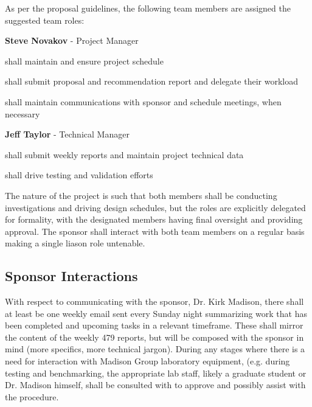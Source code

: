 As per the proposal guidelines, the following team members are assigned the
suggested team roles:
\begin{packed_itemize}
  \item{\textbf{Steve Novakov} - Project Manager}
    \begin{packed_itemize}
      \item shall maintain and ensure project schedule
      \item shall submit proposal and recommendation report and delegate their
      workload
      \item shall maintain communications with sponsor and schedule meetings,
      when necessary
    \end{packed_itemize}
  \item{\textbf{Jeff Taylor} - Technical Manager}
    \begin{packed_itemize}
      \item shall submit weekly reports and maintain project technical data
      \item shall drive testing and validation efforts
    \end{packed_itemize}
\end{packed_itemize}

The nature of the project is such that both members shall be conducting
investigations and driving design schedules, but the roles are explicitly
delegated for formality, with the designated members having final oversight
and providing approval. The sponsor shall interact with both team members on a
regular basis making a single liason role untenable.

\subsection{Sponsor Interactions}  %

With respect to communicating with the sponsor, Dr. Kirk Madison, there shall
at least be one weekly email sent every Sunday night summarizing work that has
been completed and upcoming tasks in a relevant timeframe. These shall mirror
the content of the weekly 479 reports, but will be composed with the sponsor in
mind (more specifics, more technical jargon). During any stages where there
is a need for interaction with Madison Group laboratory equipment, (e.g. during
testing and benchmarking, the appropriate lab staff, likely a graduate
student or Dr. Madison himself, shall be consulted with to approve and possibly
assist with the procedure.

